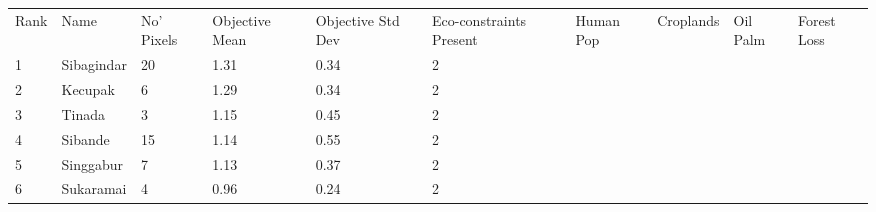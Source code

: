 \begin{table}[ht]
\centering
\begingroup\fontsize{9pt}{10pt}\selectfont
\begin{tabular}{C{0.05\textwidth}C{0.15\textwidth}C{0.08\textwidth}C{0.08\textwidth}C{0.08\textwidth}C{0.08\textwidth}C{0.08\textwidth}C{0.08\textwidth}C{0.08\textwidth}C{0.08\textwidth}}
 Rank & Name & No' Pixels & Objective Mean & Objective Std Dev & Eco-constraints  Present & Human Pop & Croplands & Oil Palm & Forest Loss \\ 
 {1} & Sibagindar &  20 & \textcolor[HTML]{FFFFFF}{1.31} & \textcolor[HTML]{000000}{0.34} & \textcolor[HTML]{000000}{2} &  &  &  &  \\ 
  {2} & Kecupak &   6 & \textcolor[HTML]{FFFFFF}{1.29} & \textcolor[HTML]{000000}{0.34} & \textcolor[HTML]{000000}{2} &  &  &  &  \\ 
  {3} & Tinada &   3 & \textcolor[HTML]{000000}{1.15} & \textcolor[HTML]{FFFFFF}{0.45} & \textcolor[HTML]{000000}{2} &  &  &  &  \\ 
  {4} & Sibande &  15 & \textcolor[HTML]{000000}{1.14} & \textcolor[HTML]{FFFFFF}{0.55} & \textcolor[HTML]{000000}{2} &  &  &  &  \\ 
  {5} & Singgabur &   7 & \textcolor[HTML]{000000}{1.13} & \textcolor[HTML]{000000}{0.37} & \textcolor[HTML]{000000}{2} &  &  &  &  \\ 
  {6} & Sukaramai &   4 & \textcolor[HTML]{000000}{0.96} & \textcolor[HTML]{000000}{0.24} & \textcolor[HTML]{000000}{2} &  &  &  &  \\ 

\end{tabular}
\end{table}
